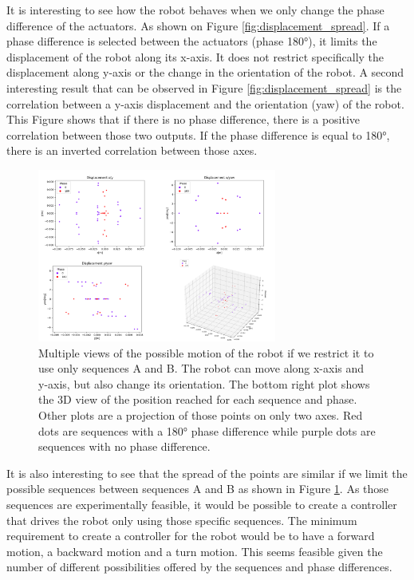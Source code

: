         It is interesting to see how the robot behaves when we only change the phase difference of the actuators. As shown on Figure \ref{fig:displacement_spread}. If a phase difference is selected between the actuators (phase 180°), it limits the displacement of the robot along its x-axis. It does not restrict specifically the displacement along y-axis or the change in the orientation of the robot. A second interesting result that can be observed in Figure \ref{fig:displacement_spread} is the correlation between a y-axis displacement and the orientation (yaw) of the robot. This Figure shows that if there is no phase difference, there is a positive correlation between those two outputs. If the phase difference is equal to 180°, there is an inverted correlation between those axes. \\
        
        \begin{figure}
            \centering
            \includegraphics[width=0.7\textwidth]{images/displacement_spread_AB.png}
            \caption{Multiple views of the possible motion of the robot if we restrict it to use only sequences A and B. The robot can move along x-axis and y-axis, but also change its orientation. The bottom right plot shows the 3D view of the position reached for each sequence and phase. Other plots are a projection of those points on only two axes. Red dots are sequences with a 180° phase difference while purple dots are sequences with no phase difference.}
            \label{fig:spreadAB}
        \end{figure}
        
        It is also interesting to see that the spread of the points are similar if we limit the possible sequences between sequences A and B as shown in Figure \ref{fig:spreadAB}. As those sequences are experimentally feasible, it would be possible to create a controller that drives the robot only using those specific sequences. The minimum requirement to create a controller for the robot would be to have a forward motion, a backward motion and a turn motion. This seems feasible given the number of different possibilities offered by the sequences and phase differences.\\
        
